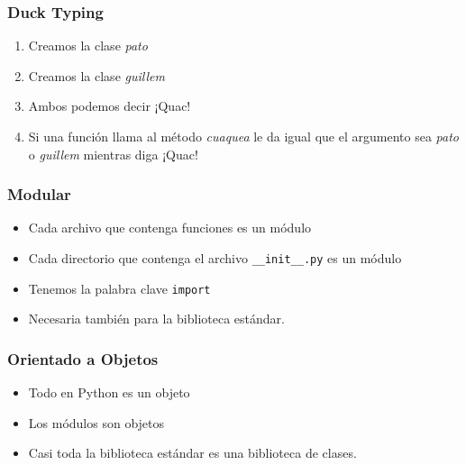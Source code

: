 \documentclass[12pt,mathserif,compress]{beamer}
\begin{document}
\begin{frame}
  \frametitle{Duck Typing}
\begin{center}
\end{center}
\begin{enumerate}
\item Creamos la clase \emph{pato}
\item Creamos la clase \emph{guillem}
\pause
\item Ambos podemos decir ¡Quac!
\pause
\item Si una función llama al método \emph{cuaquea} le da igual que el
  argumento sea \emph{pato} o \emph{guillem} mientras diga ¡Quac!
\end{enumerate}
\end{frame}

\begin{frame}
  \frametitle{Modular}
  \begin{itemize}
  \item Cada archivo que contenga funciones es un módulo
  \item Cada directorio que contenga el archivo \texttt{\_\_init\_\_.py}
    es un módulo
  \item Tenemos la palabra clave \texttt{import}
  \item Necesaria también para la biblioteca estándar.
  \end{itemize}
\end{frame}

\begin{frame}
  \frametitle{Orientado a Objetos}
  \begin{itemize}
  \item Todo en Python es un objeto
  \item Los módulos son objetos
  \item Casi toda la biblioteca estándar es una biblioteca de clases.
  \end{itemize}
\testcode
\end{frame}
\end{document}
